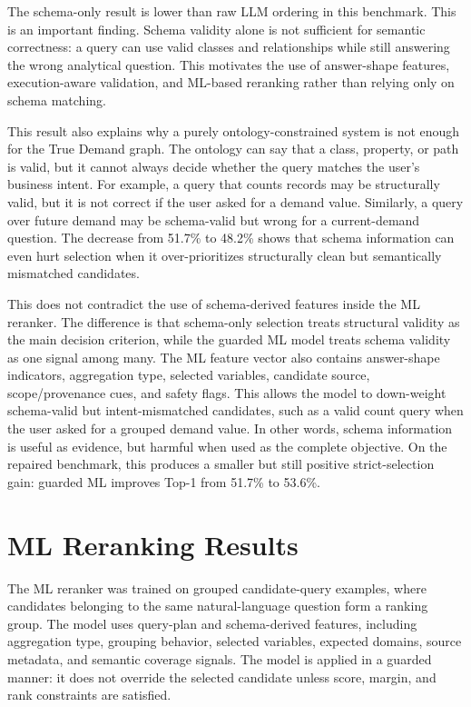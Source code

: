 \documentclass[
  12pt,
  english,
  oneside]{report}
\begin{document}
The schema-only result is lower than raw LLM ordering in this benchmark. This is an important finding. Schema validity alone is not sufficient for semantic correctness: a query can use valid classes and relationships while still answering the wrong analytical question. This motivates the use of answer-shape features, execution-aware validation, and ML-based reranking rather than relying only on schema matching.

This result also explains why a purely ontology-constrained system is not enough for the True Demand graph. The ontology can say that a class, property, or path is valid, but it cannot always decide whether the query matches the user's business intent. For example, a query that counts records may be structurally valid, but it is not correct if the user asked for a demand value. Similarly, a query over future demand may be schema-valid but wrong for a current-demand question. The decrease from 51.7\% to 48.2\% shows that schema information can even hurt selection when it over-prioritizes structurally clean but semantically mismatched candidates.

This does not contradict the use of schema-derived features inside the ML reranker. The difference is that schema-only selection treats structural validity as the main decision criterion, while the guarded ML model treats schema validity as one signal among many. The ML feature vector also contains answer-shape indicators, aggregation type, selected variables, candidate source, scope/provenance cues, and safety flags. This allows the model to down-weight schema-valid but intent-mismatched candidates, such as a valid count query when the user asked for a grouped demand value. In other words, schema information is useful as evidence, but harmful when used as the complete objective. On the repaired benchmark, this produces a smaller but still positive strict-selection gain: guarded ML improves Top-1 from 51.7\% to 53.6\%.

\section{ML Reranking Results}
\label{sec:ml-reranking-results}

The ML reranker was trained on grouped candidate-query examples, where candidates belonging to the same natural-language question form a ranking group. The model uses query-plan and schema-derived features, including aggregation type, grouping behavior, selected variables, expected domains, source metadata, and semantic coverage signals. The model is applied in a guarded manner: it does not override the selected candidate unless score, margin, and rank constraints are satisfied.
\end{document}

